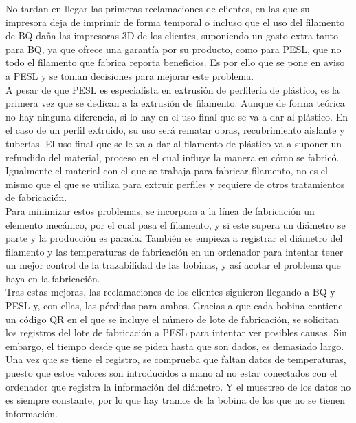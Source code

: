 No tardan en llegar las primeras reclamaciones de clientes, en las que su impresora deja de imprimir de forma temporal o incluso que el uso del filamento de BQ daña las impresoras 3D de los clientes, suponiendo un gasto extra tanto para BQ, ya que ofrece una garantía por su producto, como para PESL, que no todo el filamento que fabrica reporta beneficios. Es por ello que se pone en aviso a PESL y se toman decisiones para mejorar este problema.\\

A pesar de que PESL es especialista en extrusión de perfilería de plástico, es la primera vez que se dedican a la extrusión de filamento. Aunque de forma teórica no hay ninguna diferencia, si lo hay en el uso final que se va a dar al plástico. En el caso de un perfil extruido, su uso será rematar obras, recubrimiento aislante y tuberías. El uso final que se le va a dar al filamento de plástico va a suponer un refundido del material, proceso en el cual influye la manera en cómo se fabricó. Igualmente el material con el que se trabaja para fabricar filamento, no es el mismo que el que se utiliza para extruir perfiles y requiere de otros tratamientos de fabricación.\\ 

Para minimizar estos problemas, se incorpora a la línea de fabricación un elemento mecánico, por el cual pasa el filamento, y si este supera un diámetro se parte y la producción es parada. También se empieza a registrar el diámetro del filamento y las temperaturas de fabricación en un ordenador para intentar tener un mejor control de la trazabilidad de las bobinas, y así acotar el problema que haya en la fabricación.\\

Tras estas mejoras, las reclamaciones de los clientes siguieron llegando a BQ y PESL y, con ellas, las pérdidas para ambos. Gracias a que cada bobina contiene un código QR en el que se incluye el número de lote de fabricación, se solicitan los registros del lote de fabricación a PESL para intentar ver posibles causas. Sin embargo, el tiempo desde que se piden hasta que son dados, es demasiado largo. Una vez que se tiene el registro, se comprueba que faltan datos de temperaturas, puesto que estos valores son introducidos a mano al no estar conectados con el ordenador que registra la información del diámetro. Y el muestreo de los datos no es siempre constante, por lo que hay tramos de la bobina de los que no se tienen información.\\

